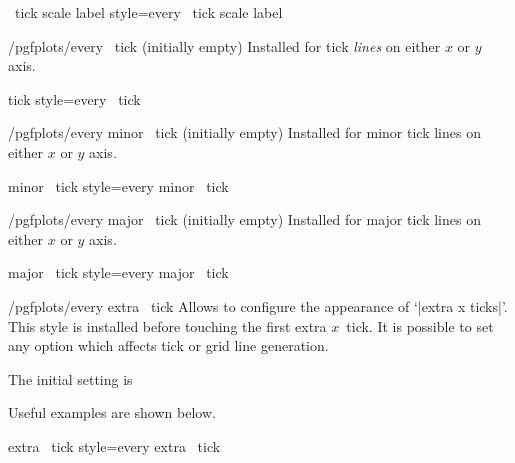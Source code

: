 \pgfplotsshortxystylekey \x\ tick scale label style=every \x\ tick scale label\pgfeov

\begin{xystylekey}{/pgfplots/every \x\ tick (initially empty)}
	Installed for tick \emph{lines} on either $x$ or $y$ axis.
\end{xystylekey}

\pgfplotsshortxystylekey \x tick style=every \x\ tick\pgfeov

\begin{xystylekey}{/pgfplots/every minor \x\ tick (initially empty)}
	Installed for minor tick lines on either $x$ or $y$ axis.
\end{xystylekey}

\pgfplotsshortxystylekey minor \x\ tick style=every minor \x\ tick\pgfeov

\begin{xystylekey}{/pgfplots/every major \x\ tick (initially empty)}
	Installed for major tick lines on either $x$ or $y$ axis.
\end{xystylekey}
\pgfplotsshortxystylekey major \x\ tick style=every major \x\ tick\pgfeov

\begin{xystylekey}{/pgfplots/every extra \x\ tick}
 Allows to configure the appearance of `|extra x ticks|'. This style is installed before touching the first extra $x$~tick. It is possible to set any option which affects tick or grid line generation.

The initial setting is
\begin{codeexample}
\end{codeexample}

 Useful examples are shown below.
\begin{codeexample}
\end{codeexample}
\end{xystylekey}

\pgfplotsshortxystylekey extra \x\ tick style=every extra \x\ tick\pgfeov

